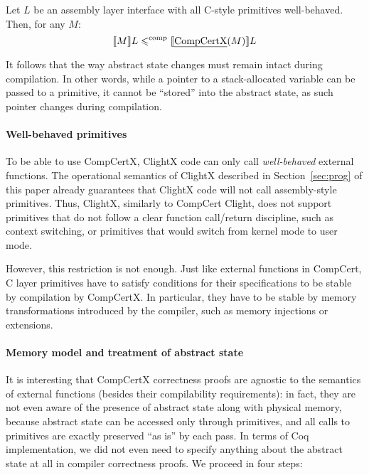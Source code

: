 \begin{theorem}
\label{theorem:compcorect}
Let $L$ be an assembly layer interface with all C-style primitives
well-behaved. Then, for any $M$:
\[
\llbracket M \rrbracket L \leqslant^{\textrm{comp}} \llbracket \textrm{\emph{CompCertX}}(M) \rrbracket L
\]
\end{theorem}




It follows that the way abstract state changes must remain intact during
compilation.
In other words, while a pointer to a stack-allocated
variable can be passed to a primitive, it cannot be ``stored'' into
the abstract state, as such pointer changes during compilation.

\paragraph{Well-behaved primitives}

To be able to use CompCertX, ClightX code can only call
\emph{well-behaved} external functions. The operational semantics of
ClightX described in Section~\ref{sec:prog} of this paper already
guarantees that ClightX code will not call assembly-style primitives. Thus,
ClightX, similarly to CompCert Clight, does not support primitives
that do not follow a clear function call/return discipline, such as
context switching, or primitives that would switch from kernel mode to
user mode.

However, this restriction is not enough. Just like external functions
in CompCert, C layer primitives have to satisfy conditions for their
specifications to be stable by compilation by CompCertX. In
particular, they have to be stable by memory transformations
introduced by the compiler, such as memory injections or extensions.



\paragraph{Memory model and treatment of abstract state}

It is interesting that CompCertX correctness proofs are agnostic to
the semantics of external functions (besides their compilability
requirements): in fact, they are not even aware of the presence of
abstract state along with physical memory, because abstract state can
be accessed only through primitives, and all calls to primitives are
exactly preserved ``as is'' by each pass. In terms of Coq
implementation, we did not even need to specify anything about the
abstract state at all in compiler correctness proofs. We proceed in four steps:

